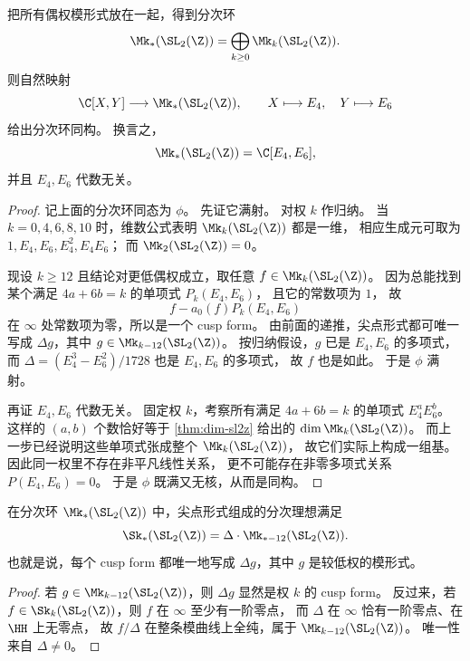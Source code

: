 \begin{theorem}[全模群模形式的分次环]
\label{thm:graded-ring-sl2z}
把所有偶权模形式放在一起，得到分次环
\[
  \Mk_*(\SL_2(\Z))=\bigoplus_{k\ge 0}\Mk_k(\SL_2(\Z)).
\]
则自然映射
\[
  \C[X,Y]\longrightarrow \Mk_*(\SL_2(\Z)),
  \qquad X\longmapsto E_4,
  \quad Y\longmapsto E_6
\]
给出分次环同构。
换言之，
\[
  \Mk_*(\SL_2(\Z))=\C[E_4,E_6],
\]
并且 $E_4,E_6$ 代数无关。
\end{theorem}

\begin{proof}
记上面的分次环同态为 $\phi$。
先证它满射。
对权 $k$ 作归纳。
当 $k=0,4,6,8,10$ 时，维数公式表明 $\Mk_k(\SL_2(\Z))$ 都是一维，
相应生成元可取为 $1,E_4,E_6,E_4^2,E_4E_6$；
而 $\Mk_2(\SL_2(\Z))=0$。

现设 $k\ge 12$ 且结论对更低偶权成立，取任意
$f\in \Mk_k(\SL_2(\Z))$。
因为总能找到某个满足 $4a+6b=k$ 的单项式 $P_k(E_4,E_6)$，
且它的常数项为 $1$，
故
\[
  f-a_0(f)P_k(E_4,E_6)
\]
在 $\infty$ 处常数项为零，所以是一个 cusp form。
由前面的递推，尖点形式都可唯一写成 $\Delta g$，其中
$g\in \Mk_{k-12}(\SL_2(\Z))$。
按归纳假设，$g$ 已是 $E_4,E_6$ 的多项式，
而 $\Delta=(E_4^3-E_6^2)/1728$ 也是 $E_4,E_6$ 的多项式，
故 $f$ 也是如此。
于是 $\phi$ 满射。

再证 $E_4,E_6$ 代数无关。
固定权 $k$，考察所有满足 $4a+6b=k$ 的单项式 $E_4^aE_6^b$。
这样的 $(a,b)$ 个数恰好等于 \cref{thm:dim-sl2z} 给出的 $\dim \Mk_k(\SL_2(\Z))$。
而上一步已经说明这些单项式张成整个 $\Mk_k(\SL_2(\Z))$，
故它们实际上构成一组基。
因此同一权里不存在非平凡线性关系，
更不可能存在非零多项式关系 $P(E_4,E_6)=0$。
于是 $\phi$ 既满又无核，从而是同构。
\end{proof}

\begin{corollary}
\label{cor:cusp-ideal-generated-by-delta}
在分次环 $\Mk_*(\SL_2(\Z))$ 中，尖点形式组成的分次理想满足
\[
  \Sk_*(\SL_2(\Z))=\Delta\cdot \Mk_{*-12}(\SL_2(\Z)).
\]
也就是说，每个 cusp form 都唯一地写成 $\Delta g$，其中 $g$ 是较低权的模形式。
\end{corollary}

\begin{proof}
若 $g\in \Mk_{k-12}(\SL_2(\Z))$，则 $\Delta g$ 显然是权 $k$ 的 cusp form。
反过来，若 $f\in \Sk_k(\SL_2(\Z))$，则 $f$ 在 $\infty$ 至少有一阶零点，
而 $\Delta$ 在 $\infty$ 恰有一阶零点、在 $\HH$ 上无零点，
故 $f/\Delta$ 在整条模曲线上全纯，属于 $\Mk_{k-12}(\SL_2(\Z))$。
唯一性来自 $\Delta\neq 0$。
\end{proof}

